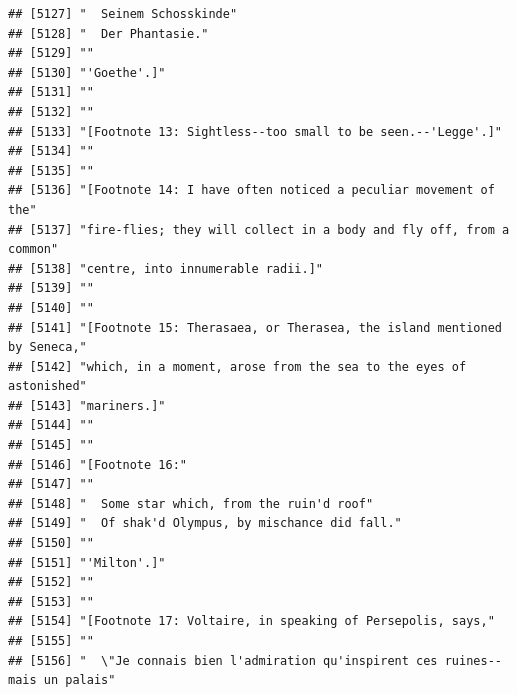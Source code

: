 \documentclass{article}\usepackage[]{graphicx}\usepackage[]{color}
\makeatletter
\newenvironment{kframe}{%
 \def\at@end@of@kframe{}%
 \ifinner\ifhmode%
  \def\at@end@of@kframe{\end{minipage}}%
  \begin{minipage}{\columnwidth}%
 \fi\fi%
 \def\FrameCommand##1{\hskip\@totalleftmargin \hskip-\fboxsep
 \colorbox{shadecolor}{##1}\hskip-\fboxsep
     \hskip-\linewidth \hskip-\@totalleftmargin \hskip\columnwidth}%
 \MakeFramed {\advance\hsize-\width
   \@totalleftmargin\z@ \linewidth\hsize
   \@setminipage}}%
 {\par\unskip\endMakeFramed%
 \at@end@of@kframe}
\newenvironment{knitrout}{}{} %
\makeatother
\begin{document}
\begin{knitrout}
\begin{kframe}
\begin{verbatim}
## [5127] "  Seinem Schosskinde"                                                        
## [5128] "  Der Phantasie."                                                            
## [5129] ""                                                                            
## [5130] "'Goethe'.]"                                                                  
## [5131] ""                                                                            
## [5132] ""                                                                            
## [5133] "[Footnote 13: Sightless--too small to be seen.--'Legge'.]"                   
## [5134] ""                                                                            
## [5135] ""                                                                            
## [5136] "[Footnote 14: I have often noticed a peculiar movement of the"               
## [5137] "fire-flies; they will collect in a body and fly off, from a common"          
## [5138] "centre, into innumerable radii.]"                                            
## [5139] ""                                                                            
## [5140] ""                                                                            
## [5141] "[Footnote 15: Therasaea, or Therasea, the island mentioned by Seneca,"       
## [5142] "which, in a moment, arose from the sea to the eyes of astonished"            
## [5143] "mariners.]"                                                                  
## [5144] ""                                                                            
## [5145] ""                                                                            
## [5146] "[Footnote 16:"                                                               
## [5147] ""                                                                            
## [5148] "  Some star which, from the ruin'd roof"                                     
## [5149] "  Of shak'd Olympus, by mischance did fall."                                 
## [5150] ""                                                                            
## [5151] "'Milton'.]"                                                                  
## [5152] ""                                                                            
## [5153] ""                                                                            
## [5154] "[Footnote 17: Voltaire, in speaking of Persepolis, says,"                    
## [5155] ""                                                                            
## [5156] "  \"Je connais bien l'admiration qu'inspirent ces ruines--mais un palais"    

\end{verbatim}
\end{kframe}
\end{knitrout}
\end{document}
